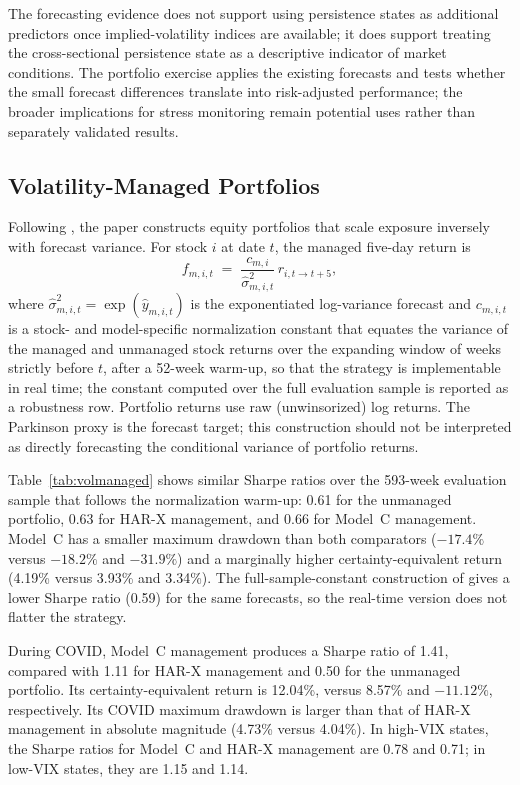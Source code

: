 \documentclass[jrfm,article,submit,moreauthors,pdftex]{Definitions/mdpi}
\begin{document}
The forecasting evidence does not support using persistence states as
additional predictors once implied-volatility indices are available; it
does support treating the cross-sectional persistence state as a
descriptive indicator of market conditions. The portfolio exercise applies
the existing forecasts and tests whether the small forecast differences
translate into risk-adjusted performance; the broader implications for
stress monitoring remain potential uses rather than separately validated
results.

\subsection{Volatility-Managed Portfolios}
\label{subsec:volmanaged}

Following \citet{moreira2017volatility}, the paper constructs equity
portfolios that scale exposure inversely with forecast variance. For stock
$i$ at date $t$, the managed five-day return is
\begin{equation}
  f_{m,i,t} \;=\; \frac{c_{m,i}}{\hat{\sigma}^2_{m,i,t}}\,r_{i,t\to t+5},
\end{equation}
where $\hat\sigma^2_{m,i,t}=\exp(\hat y_{m,i,t})$ is the exponentiated
log-variance forecast and $c_{m,i,t}$ is a stock- and model-specific
normalization constant that equates the variance of the managed and
unmanaged stock returns over the expanding window of weeks strictly before
$t$, after a 52-week warm-up, so that the strategy is implementable in real
time; the \citet{moreira2017volatility} constant computed over the full
evaluation sample is reported as a robustness row. Portfolio returns use
raw (unwinsorized) log returns. The Parkinson proxy is the forecast
target; this construction should not be interpreted as directly forecasting
the conditional variance of portfolio returns.

Table~\ref{tab:volmanaged} shows similar Sharpe ratios over the 593-week
evaluation sample that follows the normalization warm-up: 0.61 for the
unmanaged portfolio, 0.63 for HAR-X management, and 0.66 for Model~C
management. Model~C has a smaller maximum drawdown than both comparators
($-17.4\%$ versus $-18.2\%$ and $-31.9\%$) and a marginally higher
certainty-equivalent return (4.19\% versus 3.93\% and 3.34\%). The
full-sample-constant construction of \citet{moreira2017volatility} gives
a lower Sharpe ratio (0.59) for the same forecasts, so the real-time
version does not flatter the strategy.

During COVID, Model~C management produces a Sharpe ratio of 1.41, compared
with 1.11 for HAR-X management and 0.50 for the unmanaged portfolio. Its
certainty-equivalent return is 12.04\%, versus 8.57\% and $-11.12\%$,
respectively. Its COVID maximum drawdown is larger than that of HAR-X
management in absolute magnitude (4.73\% versus 4.04\%). In high-VIX states,
the Sharpe ratios for Model~C and HAR-X management are 0.78 and 0.71; in
low-VIX states, they are 1.15 and 1.14.
\end{document}
